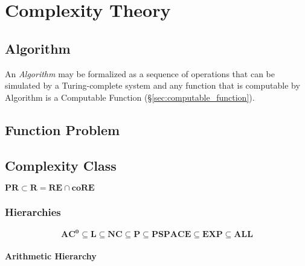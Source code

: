 \documentclass{article}
\begin{document}
\section{Complexity Theory}

\subsection{Algorithm}\label{subsec:algorithm}

An \emph{Algorithm} may be formalized as a sequence of operations that
can be simulated by a Turing-complete system and any function that is
computable by Algorithm is a Computable Function
(\S\ref{sec:computable_function}).

\subsection{Function Problem}\label{subsec:function_problem}

\subsection{Complexity Class}\label{subsec:complexity_class}

$\mathbf{PR} \subset \mathbf{R} = \mathbf{RE} \cap \mathbf{coRE}$

\subsubsection{Hierarchies}\label{subsec:complexity_hierarchy}

\[
    \mathbf{AC^0} \subseteq \mathbf{L} \subseteq \mathbf{NC} \subseteq
    \mathbf{P} \subseteq \mathbf{PSPACE} \subseteq \mathbf{EXP}
    \subseteq \mathbf{ALL}
\]

\paragraph{Arithmetic Hierarchy}
\end{document}
